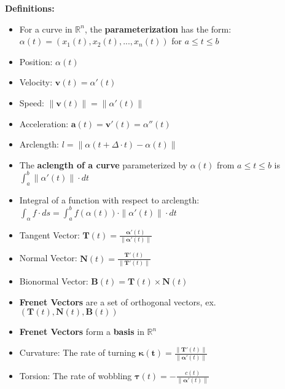 \documentclass[12pt, letterpaper]{article}
\begin{document}
\textbf{Definitions:} 
\begin{itemize}
    \item For a curve in $\mathbb{R}^n$, the \textbf{parameterization} has the form: $\alpha(t) = (x_1(t), x_2(t),...,x_n(t))$ for $a \leq t \leq b$ \\
    \item Position: $\alpha(t)$
    \item Velocity: $\mathbf{v}(t) = \alpha'(t)$
    \item Speed: $\|\mathbf{v}(t)\| = \|\alpha'(t)\|$
    \item Acceleration: $\mathbf{a}(t) = \mathbf{v}'(t) = \alpha''(t)$ \\
    \item Arclength: $l = \|\alpha(t + \Delta\cdot t ) - \alpha(t)\|$
    \item The \textbf{aclength of a curve} parameterized by $\alpha(t)$ from $a \leq t \leq b$ is $\int_{a}^{b} \|\alpha'(t)\| \cdot dt$ 
    \item Integral of a function with respect to arclength: $\int_{\alpha} f \cdot ds = \int_{a}^{b}f(\alpha(t)) \cdot \|\alpha'(t)\| \cdot dt$ \\
    \item Tangent Vector: $\mathbf{T}(t) = \frac{\mathbf{\alpha}'(t)}{\|\mathbf{\alpha}'(t)\|}$
    \item Normal Vector: $\mathbf{N}(t) = \frac{\mathbf{T}'(t)}{\|\mathbf{T}'(t)\|}$
    \item Bionormal Vector: $\mathbf{B}(t) = \mathbf{T}(t) \times \mathbf{N}(t)$ \\
    \item \textbf{Frenet Vectors} are a set of orthogonal vectors, ex. $(\mathbf{T}(t), \mathbf{N}(t), \mathbf{B}(t))$
    \item \textbf{Frenet Vectors} form a \textbf{basis} in $\mathbb{R}^n$ \\
    \item Curvature: The rate of turning $\mathbf{\kappa(t)} = \frac{\|\mathbf{T}'(t)\|}{\|\mathbf{\alpha}'(t)\|}$
    \item Torsion: The rate of wobbling $\mathbf{\tau}(t) = - \frac{c(t)}{\|\mathbf{\alpha}'(t)\|}$ \\
\end{itemize}
\end{document}
